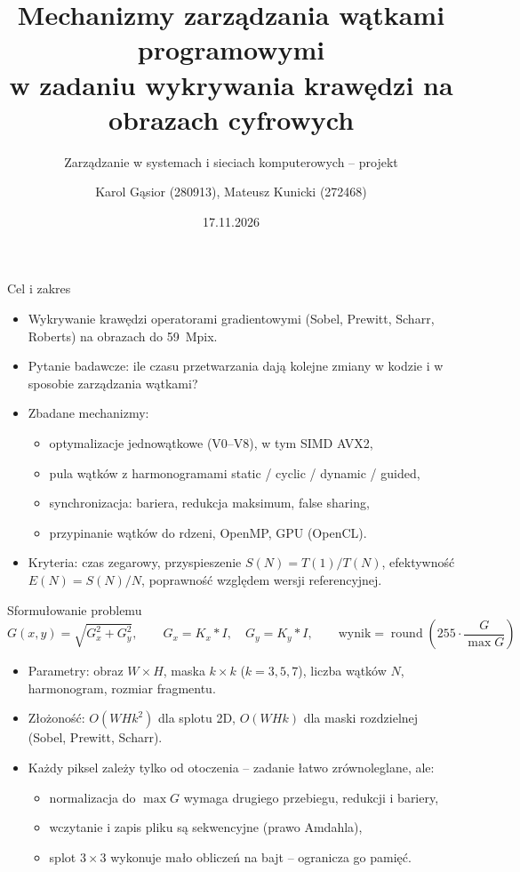 \documentclass[aspectratio=169,11pt]{beamer}
\title{Mechanizmy zarządzania wątkami programowymi\\w zadaniu wykrywania krawędzi na obrazach cyfrowych}
\subtitle{Zarządzanie w systemach i sieciach komputerowych -- projekt}
\author{Karol Gąsior (280913), Mateusz Kunicki (272468)}
\institute{Politechnika Wrocławska, W4N\\Prowadzący: dr inż.\ Robert Wójcik, grupa G2}
\date{17.11.2026}
\begin{document}
\begin{frame}
	\titlepage
\end{frame}

\begin{frame}{Cel i zakres}
	\begin{itemize}
		\item Wykrywanie krawędzi operatorami gradientowymi (Sobel, Prewitt, Scharr, Roberts) na obrazach do 59~Mpix.
		\item Pytanie badawcze: ile czasu przetwarzania dają kolejne zmiany w kodzie i w sposobie zarządzania wątkami?
		\item Zbadane mechanizmy:
		\begin{itemize}
			\item optymalizacje jednowątkowe (V0--V8), w tym SIMD AVX2,
			\item pula wątków z harmonogramami static / cyclic / dynamic / guided,
			\item synchronizacja: bariera, redukcja maksimum, false sharing,
			\item przypinanie wątków do rdzeni, OpenMP, GPU (OpenCL).
		\end{itemize}
		\item Kryteria: czas zegarowy, przyspieszenie $S(N) = T(1)/T(N)$, efektywność $E(N) = S(N)/N$, poprawność względem wersji referencyjnej.
	\end{itemize}
\end{frame}

\begin{frame}{Sformułowanie problemu}
	\[
		G(x, y) = \sqrt{G_x^{2} + G_y^{2}}, \qquad G_x = K_x * I, \quad G_y = K_y * I,
		\qquad \text{wynik} = \operatorname{round}\!\left(255 \cdot \frac{G}{\max G}\right)
	\]
	\begin{itemize}
		\item Parametry: obraz $W \times H$, maska $k \times k$ ($k = 3, 5, 7$), liczba wątków $N$, harmonogram, rozmiar fragmentu.
		\item Złożoność: $O(W H k^{2})$ dla splotu 2D, $O(W H k)$ dla maski rozdzielnej (Sobel, Prewitt, Scharr).
		\item Każdy piksel zależy tylko od otoczenia -- zadanie łatwo zrównoleglane, ale:
		\begin{itemize}
			\item normalizacja do $\max G$ wymaga drugiego przebiegu, redukcji i bariery,
			\item wczytanie i zapis pliku są sekwencyjne (prawo Amdahla),
			\item splot $3 \times 3$ wykonuje mało obliczeń na bajt -- ogranicza go pamięć.
		\end{itemize}
	\end{itemize}
\end{frame}
\end{document}
